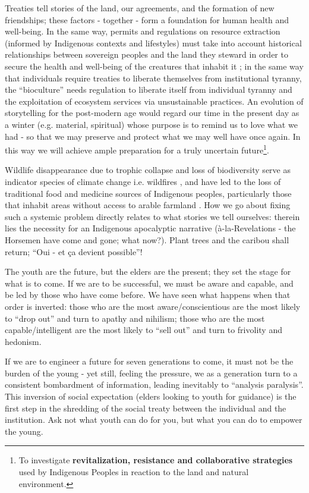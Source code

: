 \documentclass{report}
\begin{document}
Treaties tell stories of the land, our agreements, and the formation of new friendships; these factors - together - form a foundation for human health and well-being. In the same way, permits and regulations on resource extraction (informed by Indigenous contexts and lifestyles) must take into account historical relationships between sovereign peoples and the land they steward in order to secure the health and well-being of the creatures that inhabit it \parencite{togetherness}; in the same way that individuals require treaties to liberate themselves from institutional tyranny, the ``bioculture'' needs regulation to liberate itself from individual tyranny and the exploitation of ecosystem services via unsustainable practices. An evolution of storytelling for the post-modern age would regard our time in the present day as a winter (e.g. material, spiritual) whose purpose is to remind us to love what we had - so that we may preserve and protect what we may well have once again. In this way we will achieve ample preparation for a truly uncertain future\footnote{To investigate \textbf{revitalization, resistance and collaborative strategies} used by Indigenous Peoples in reaction to the land and natural environment. }.

Wildlife disappearance due to trophic collapse and loss of biodiversity serve as indicator species of climate change i.e. wildfires \parencite{nwtcaribou}, and have led to the loss of traditional food and medicine sources of Indigenous peoples, particularly those that inhabit areas without access to arable farmland \parencite{jonassangris}. How we go about fixing such a systemic problem directly relates to what stories we tell ourselves: therein lies the necessity for an Indigenous apocalyptic narrative (à-la-Revelations - the Horsemen have come and gone; what now?). Plant trees and the caribou shall return; ``Oui - et ça devient possible''!

The youth are the future, but the elders are the present; they set the stage for what is to come. If we are to be successful, we must be aware and capable, and be led by those who have come before. We have seen what happens when that order is inverted: those who are the most aware/conscientious are the most likely to ``drop out'' and turn to apathy and nihilism; those who are the most capable/intelligent are the most likely to ``sell out'' and turn to frivolity and hedonism.

If we are to engineer a future for seven generations to come, it must not be the burden of the young - yet still, feeling the pressure, we as a generation turn to a consistent bombardment of information, leading inevitably to ``analysis paralysis''. This inversion of social expectation (elders looking to youth for guidance) is the first step in the shredding of the social treaty between the individual and the institution. Ask not what youth can do for you, but what you can do to empower the young.

\clearpage

\printbibliography
\end{document}
